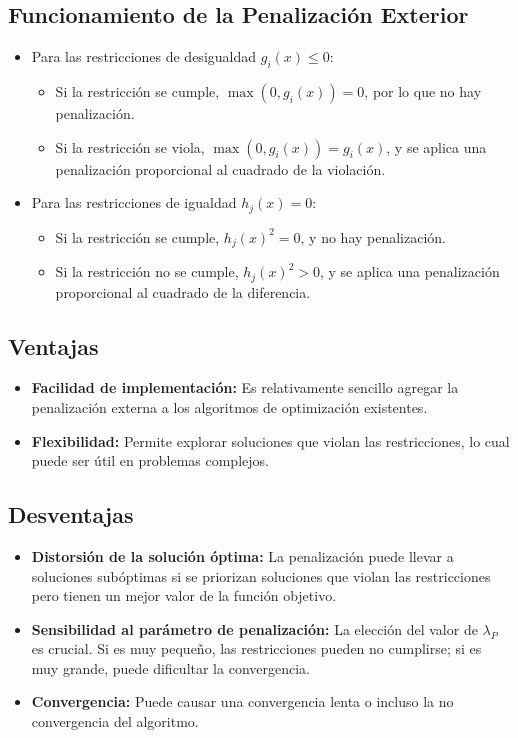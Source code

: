 \subsection*{Funcionamiento de la Penalización Exterior}

\begin{itemize}
    \item Para las restricciones de desigualdad \( g_i(x) \leq 0 \):
    \begin{itemize}
        \item Si la restricción se cumple, \( \max(0, g_i(x)) = 0 \), por lo que no hay penalización.
        \item Si la restricción se viola, \( \max(0, g_i(x)) = g_i(x) \), y se aplica una penalización proporcional al cuadrado de la violación.
    \end{itemize}
    \item Para las restricciones de igualdad \( h_j(x) = 0 \):
    \begin{itemize}
        \item Si la restricción se cumple, \( h_j{(x)}^2 = 0 \), y no hay penalización.
        \item Si la restricción no se cumple, \( h_j{(x)}^2 > 0 \), y se aplica una penalización proporcional al cuadrado de la diferencia.
    \end{itemize}
\end{itemize}

\subsection*{Ventajas}

\begin{itemize}
    \item \textbf{Facilidad de implementación:} Es relativamente sencillo agregar la penalización externa a los algoritmos de optimización existentes.
    \item \textbf{Flexibilidad:} Permite explorar soluciones que violan las restricciones, lo cual puede ser útil en problemas complejos.
\end{itemize}

\subsection*{Desventajas}

\begin{itemize}
    \item \textbf{Distorsión de la solución óptima:} La penalización puede llevar a soluciones subóptimas si se priorizan soluciones que violan las restricciones pero tienen un mejor valor de la función objetivo.
    \item \textbf{Sensibilidad al parámetro de penalización:} La elección del valor de \( \lambda_P \) es crucial. Si es muy pequeño, las restricciones pueden no cumplirse; si es muy grande, puede dificultar la convergencia.
    \item \textbf{Convergencia:} Puede causar una convergencia lenta o incluso la no convergencia del algoritmo.
\end{itemize}